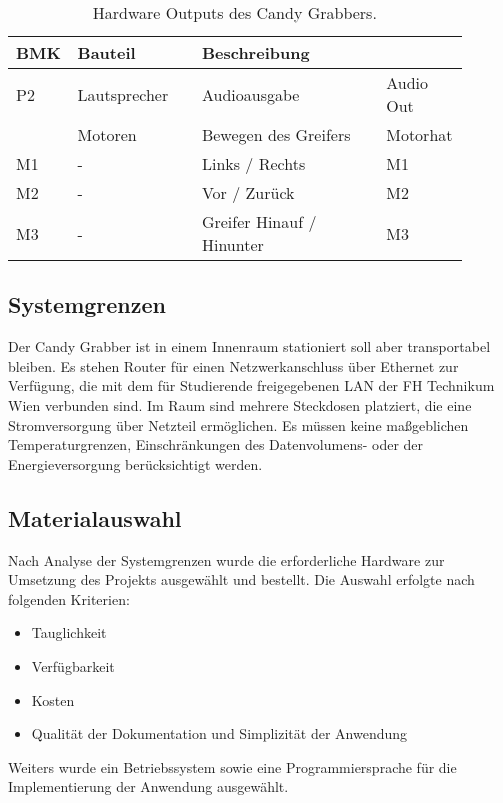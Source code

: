 \documentclass[BMR,Bachelor,ngerman]{twbook}%
\begin{document}
\begin{table}[H]
\caption{Hardware Outputs des Candy Grabbers.}\label{tab:Os}
\begin{tabular}{| p{0.08\linewidth} | p{0.27\linewidth} | p{0.4\linewidth} | p{0.15\linewidth} |}\hline
\rowcolor[gray]{0.8} BMK & Bauteil & Beschreibung & \\\hline
P2 & Lautsprecher & Audioausgabe & Audio Out\\\hline
 & Motoren & Bewegen des Greifers& Motorhat\\
 M1 & - & Links / Rechts & M1\\
 M2 & - & Vor / Zurück & M2\\
 M3 & - & Greifer Hinauf / Hinunter & M3\\\hline
\end{tabular}
\end{table}
%
\subsection{Systemgrenzen}
Der Candy Grabber ist in einem Innenraum stationiert soll aber transportabel bleiben. Es stehen Router für einen Netzwerkanschluss über Ethernet zur Verfügung, die mit dem für Studierende freigegebenen \ac{LAN} der FH Technikum Wien verbunden sind. Im Raum sind mehrere Steckdosen platziert, die eine Stromversorgung über Netzteil ermöglichen. Es müssen keine maßgeblichen Temperaturgrenzen, Einschränkungen des Datenvolumens- oder der Energieversorgung berücksichtigt werden. 
%
\subsection{Materialauswahl}
Nach Analyse der Systemgrenzen wurde die erforderliche Hardware zur Umsetzung des Projekts ausgewählt und bestellt. Die Auswahl erfolgte nach folgenden Kriterien: 
\begin{itemize}
	\item{Tauglichkeit}
	\item{Verfügbarkeit}
	\item{Kosten}
	\item{Qualität der Dokumentation und Simplizität der Anwendung}
\end{itemize}
Weiters wurde ein Betriebssystem sowie eine Programmiersprache für die Implementierung der Anwendung ausgewählt.
\end{document}
